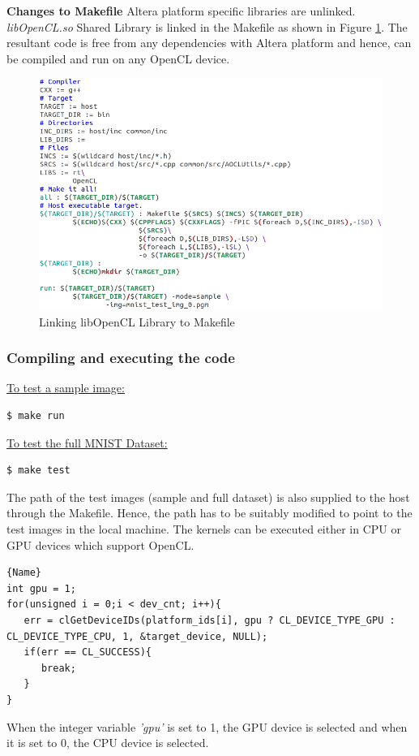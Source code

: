 \textbf{Changes to Makefile}\newline
Altera platform specific libraries are unlinked. \textit{libOpenCL.so} Shared Library is linked in the Makefile as shown in Figure \ref{fig:makefile}. The resultant code is free from any dependencies with Altera platform and hence, can be compiled and run on any OpenCL device.
\begin{figure}[h!]
\centering
\includegraphics[width=0.7\linewidth]{figures/makefile.png}
\caption{Linking libOpenCL Library to Makefile}
\label{fig:makefile}
\end{figure}
\subsubsection{Compiling and executing the code}
\label{3_1_3_4}
\underline{To test a sample image:}\newline
\begin{scriptsize}
\linuxbash
\begin{lstlisting}
$ make run
\end{lstlisting}
\end{scriptsize}
\underline{To test the full MNIST Dataset:}\newline
\begin{scriptsize}
\linuxbash
\begin{lstlisting}
$ make test
\end{lstlisting}
\end{scriptsize}
The path of the test images (sample and full dataset) is also supplied to the host through the Makefile. Hence, the path has to be suitably modified to point to the test images in the local machine.\newline\newline
The kernels can be executed either in CPU or GPU devices which support OpenCL.\newline
\hfill
\begin{minipage}{\textwidth}
\begin{center}
\begin{lstlisting}[caption= CPU or GPU Device Selection,frame=tlrb, basicstyle = \small]{Name}
int gpu = 1;
for(unsigned i = 0;i < dev_cnt; i++){
   err = clGetDeviceIDs(platform_ids[i], gpu ? CL_DEVICE_TYPE_GPU : CL_DEVICE_TYPE_CPU, 1, &target_device, NULL);
   if(err == CL_SUCCESS){
      break;
   }
}
\end{lstlisting}
\end{center}
\end{minipage}
When the integer variable \textit{'gpu'} is set to 1, the GPU device is selected and when it is set to 0, the CPU device is selected.
